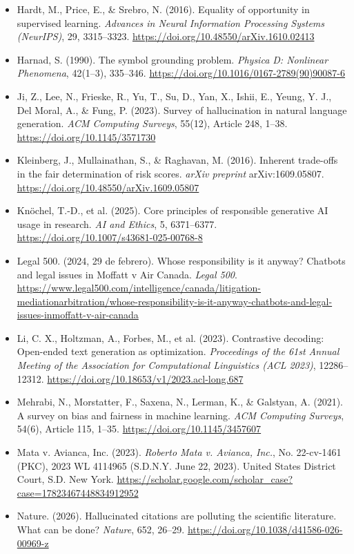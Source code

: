 \begin{itemize}[leftmargin=1.5em, label={}, itemsep=0.08ex, parsep=0pt]
    \item Hardt, M., Price, E., \& Srebro, N. (2016). Equality of opportunity in supervised learning. \textit{Advances in Neural Information Processing Systems (NeurIPS)}, 29, 3315--3323. \url{https://doi.org/10.48550/arXiv.1610.02413}
    \item Harnad, S. (1990). The symbol grounding problem. \textit{Physica D: Nonlinear Phenomena}, 42(1--3), 335--346. \url{https://doi.org/10.1016/0167-2789(90)90087-6}
    \item Ji, Z., Lee, N., Frieske, R., Yu, T., Su, D., Yan, X., Ishii, E., Yeung, Y. J., Del Moral, A., \& Fung, P. (2023). Survey of hallucination in natural language generation. \textit{ACM Computing Surveys}, 55(12), Article 248, 1--38. \url{https://doi.org/10.1145/3571730}
    \item Kleinberg, J., Mullainathan, S., \& Raghavan, M. (2016). Inherent trade-offs in the fair determination of risk scores. \textit{arXiv preprint} arXiv:1609.05807. \url{https://doi.org/10.48550/arXiv.1609.05807}
    \item Knöchel, T.-D., et al. (2025). Core principles of responsible generative AI usage in research. \textit{AI and Ethics}, 5, 6371--6377. \url{https://doi.org/10.1007/s43681-025-00768-8}
    \item Legal 500. (2024, 29 de febrero). Whose responsibility is it anyway? Chatbots and legal issues in Moffatt v Air Canada. \textit{Legal 500}. \url{https://www.legal500.com/intelligence/canada/litigation-mediationarbitration/whose-responsibility-is-it-anyway-chatbots-and-legal-issues-inmoffatt-v-air-canada}
    \item Li, C. X., Holtzman, A., Forbes, M., et al. (2023). Contrastive decoding: Open-ended text generation as optimization. \textit{Proceedings of the 61st Annual Meeting of the Association for Computational Linguistics (ACL 2023)}, 12286--12312. \url{https://doi.org/10.18653/v1/2023.acl-long.687}
    \item Mehrabi, N., Morstatter, F., Saxena, N., Lerman, K., \& Galstyan, A. (2021). A survey on bias and fairness in machine learning. \textit{ACM Computing Surveys}, 54(6), Article 115, 1--35. \url{https://doi.org/10.1145/3457607}
    \item Mata v. Avianca, Inc. (2023). \textit{Roberto Mata v. Avianca, Inc.}, No. 22-cv-1461 (PKC), 2023 WL 4114965 (S.D.N.Y. June 22, 2023). United States District Court, S.D. New York. \url{https://scholar.google.com/scholar_case?case=17823467448834912952}
    \item Nature. (2026). Hallucinated citations are polluting the scientific literature. What can be done? \textit{Nature}, 652, 26--29. \url{https://doi.org/10.1038/d41586-026-00969-z}

\end{itemize}
